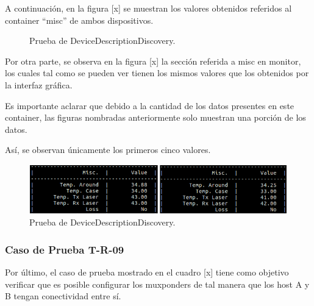     A continuación, en la figura [x] se muestran los valores obtenidos referidos al container “misc” de ambos dispositivos. 

    \begin{figure}[H]
        \centering
        \caption{Prueba de DeviceDescriptionDiscovery.}
        \label{fig:test2}
      \end{figure}

      Por otra parte, se observa en la figura [x] la sección referida a misc en monitor, los cuales tal como se pueden ver tienen los mismos valores que los obtenidos por la interfaz gráfica. 
      
      Es importante aclarar que debido a la cantidad de los datos presentes en este container, las figuras nombradas anteriormente solo muestran una porción de los datos.
      
      Así, se observan únicamente los primeros cinco valores.

      \begin{figure}[H]
        \centering
        \includegraphics[scale=0.5]{Figures/test8_2.png}
        \caption{Prueba de DeviceDescriptionDiscovery.}
        \label{fig:test2}
      \end{figure}

      \subsubsection{Caso de Prueba T-R-09}

      Por último, el caso de prueba mostrado en el cuadro [x] tiene como objetivo verificar que es posible configurar los muxponders de tal manera que los host A y B tengan conectividad entre sí. 

